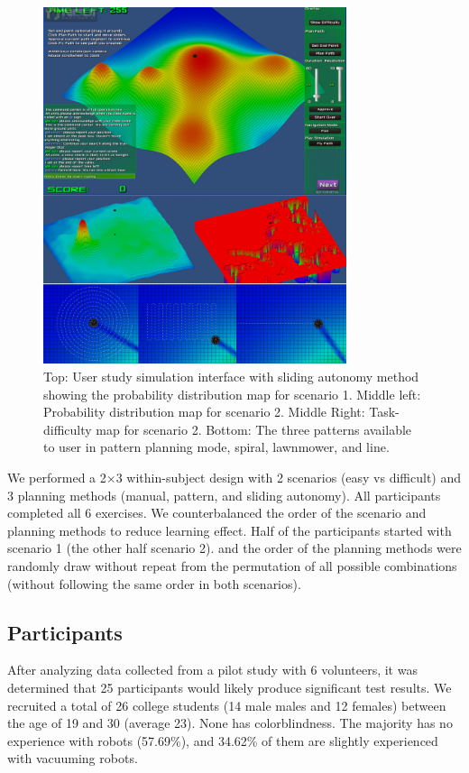 \documentclass[journal]{IEEEtran}
\begin{document}
\begin{figure}
\centering
\includegraphics[width=3.5in]{UserStudy.JPG}
\caption{Top: User study simulation interface with sliding autonomy method showing the probability distribution map for scenario 1. Middle left: Probability distribution map for scenario 2. Middle Right: Task-difficulty map for scenario 2. Bottom: The three patterns available to user in pattern planning mode, spiral, lawnmower, and line.}
\label{UserStudy}
\end{figure}

We performed a 2$\times$3 within-subject design with 2 scenarios (easy vs difficult) and 3 planning methods (manual, pattern, and sliding autonomy). All participants completed all 6 exercises. We counterbalanced the order of the scenario and planning methods to reduce learning effect. Half of the participants started with scenario 1 (the other half scenario 2). and the order of the planning methods were randomly draw without repeat from the permutation of all possible combinations (without following the same order in both scenarios).

\subsection{Participants}

After analyzing data collected from a pilot study with 6 volunteers, it was determined that 25 participants would likely produce significant test results. We recruited a total of 26 college students (14 male males and 12 females) between the age of 19 and 30 (average 23). None has colorblindness. The majority has no experience with robots (57.69\%), and 34.62\% of them are slightly experienced with vacuuming robots.
\end{document}

